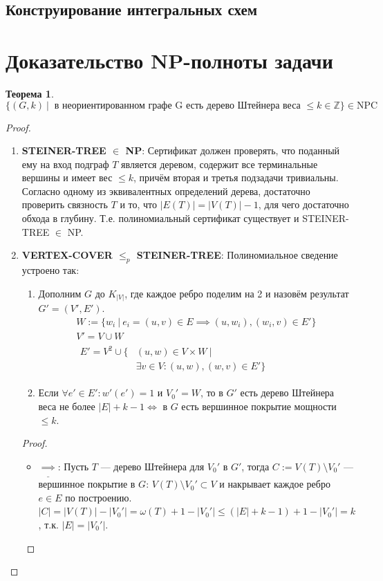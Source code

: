 \documentclass[11pt,a4paper]{report}
\def\Integer{\mathbb{Z}}
\def\le{\leqslant}
\theoremstyle{definition}
\theoremstyle{definition}
\newtheorem{theorem}{Теорема}[section]
\theoremstyle{definition}
\begin{document}
	\subsection{Конструирование интегральных схем}
	\section{Доказательство NP-полноты задачи}
	\begin{theorem}
		$$ \{ (G, k)\ |\ \text{ в неориентированном графе G есть дерево Штейнера веса } \le k \in \Integer \} \in \mathrm{NPC} $$
	\end{theorem}
	\begin{proof}$  $
		\begin{enumerate}
			\item \textbf{STEINER-TREE $\in$ NP}: 
				Сертификат должен проверять, что поданный ему на вход подграф $T$ является деревом, содержит все терминальные вершины и имеет вес $\le k$, причём вторая и третья подзадачи тривиальны. Согласно одному из эквивалентных определений дерева, достаточно проверить связность $T$ и то, что $|E(T)| = |V(T)| - 1$, для чего достаточно обхода в глубину. Т.е. полиномиальный сертификат существует и STEINER-TREE $\in$ NP.
			\item \textbf{VERTEX-COVER $\le_{p}$ STEINER-TREE}: Полиномиальное сведение устроено так:
			\begin{enumerate}
				\item Дополним $G$ до $K_{|V|}$, где каждое ребро поделим на 2 и назовём результат $G' = (V', E')$.
				\begin{gather*}
					W := \{ w_i\ |\ e_i = (u, v) \in E \implies (u, w_i), (w_i, v) \in E' \}\\
					V' = V \cup W\\
					\begin{aligned}
						E' = V^2 \cup \{& (u, w) \in V \times W\ |\\
						&\exists v \in V: (u, w), (w, v) \in E' \}
					\end{aligned}
				\end{gather*} 
				\item Если $\forall e' \in E': w'(e') = 1$ и $V_0' = W$, то в $G'$ есть дерево Штейнера веса не более $|E| + k - 1 \iff $ в $G$ есть вершинное покрытие мощности $\le k$.
			\end{enumerate}
			\begin{proof}$  $
				\begin{itemize}
					\item $ \underline{\implies} $: Пусть $T$ — дерево Штейнера для $V_0'$ в $G'$, тогда $C := V(T) \setminus V_0'$ — вершинное покрытие в $G$: $ V(T) \setminus V_0' \subset V$ и накрывает каждое ребро $e \in E$ по построению. $ |C| = |V(T)| - |V_0'| = \omega(T) + 1 - |V_0'| \le (|E| + k - 1) + 1 - |V_0'| = k$, т.к. $|E| = |V_0'|$. 

\end{itemize}
\end{proof}
\end{enumerate}
\end{proof}
\end{document}
